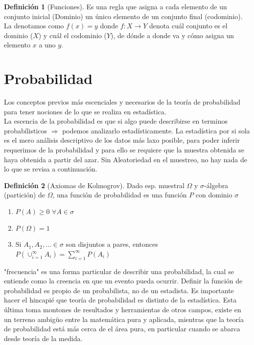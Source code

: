 \documentclass[11pt,a4paper,oneside]{report}
\theoremstyle{definition}
\newtheorem{definicion}{Definición}[chapter]
\theoremstyle{plain}
\theoremstyle{remark}
\begin{document}
\begin{definicion}[Funciones]
  Es una regla que asigna a cada elemento de un conjunto inicial (Dominio) un único elemento de un conjunto 
  final (codominio). La denotamos como $f(x)=y$ donde $f:X\rightarrow Y$ denota cuál conjunto es el dominio ($X$) y 
  cuál el codominio ($Y$), de dónde a donde va y cómo asigna un elemento $x$ a uno $y$.
\end{definicion}

\section{Probabilidad}
Los conceptos previos más escenciales y necesarios de la teoría de probabilidad para tener nociones de 
lo que se realiza en estadística.\\
La escencia de la probabilidad es que si algo puede describirse en terminos probabílisticos $\Rightarrow$ podemos
analizarlo estadísticamente. La estadística por si sola es el mero análisis descriptivo de los datos más laxo posible,
para poder inferir requerimos de la probabilidad y para ello se requiere que la muestra obtenida se haya obtenida
a partir del azar. Sin Aleatoriedad en el muestreo, no hay nada de lo que se revisa a continuación.

\begin{definicion}[Axiomas de Kolmogrov]\label{def:Kolmogrov}
  Dado esp. muestral $\Omega$ y $\sigma$-álgebra (partición) de $\Omega$,
    una función de probabilidad es una función $P$ con dominio $\sigma$
        \begin{enumerate}
        \item $P(A)\geq 0$ $\forall A \in \sigma$
        \item $P(\Omega)=1$
        \item Si $A_{1},A_{2},... \in \sigma $ son disjuntos a pares, entonces 
        $P(\cup_{i=1}^{\infty}A_{i})= \sum_{i=1}^{\infty} P(A_{i})$
        \end{enumerate}
\end{definicion}

"frecuencia" es una forma particular de describir una probabilidad, la cual se entiende como la creencia en que un
evento pueda ocurrir. Definir la función de probabilidad es propio de un probabilista, no de un estadista. 
Es importante hacer el hincapié que teoría de probabilidad es distinto de la estadística. Esta última toma montones 
de resultados y herramientas de otros campos, existe en un terreno ambigüo entre la matemática pura y aplicada, mientras que
la teoría de probabilidad está más cerca de el área pura, en particular cuando se abarca desde teoría de la medida.
\end{document}
